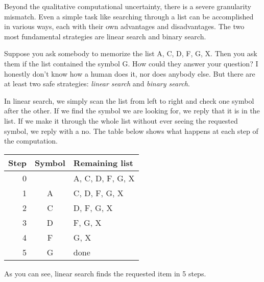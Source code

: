 Beyond the qualitative computational uncertainty, there is a severe granularity mismatch.
Even a simple task like searching through a list can be accomplished in various ways, each with their own advantages and disadvantages.
The two most fundamental strategies are linear search and binary search.
%
\begin{examplebox}
    Suppose you ask somebody to memorize the list A, C, D, F, G, X\@.
    Then you ask them if the list contained the symbol G\@.
    How could they answer your question?
    I honestly don't know how a human does it, nor does anybody else.
    But there are at least two safe strategies: \emph{linear search} and \emph{binary search}.

    In linear search, we simply scan the list from left to right and check one symbol after the other.
    If we find the symbol we are looking for, we reply that it is in the list.
    If we make it through the whole list without ever seeing the requested symbol, we reply with a no.
    The table below shows what happens at each step of the computation.
    \begin{center}
        \begin{tabular}{rcl}
            \toprule
            \textbf{Step} & \textbf{Symbol} & \textbf{Remaining list}\\
            \midrule
            0 &   & A, C, D, F, G, X\\
            1 & A & C, D, F, G, X\\
            2 & C & D, F, G, X\\
            3 & D & F, G, X\\
            4 & F & G, X\\
            5 & G & done\\
            \bottomrule
        \end{tabular}
    \end{center}
    As you can see, linear search finds the requested item in 5 steps.


\end{examplebox}
